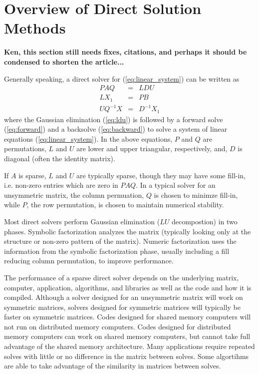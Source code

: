 \documentclass[acmtocl]{acmtrans2m}
\begin{document}
\section{Overview of Direct Solution Methods}
\label{sec:overview}

{\bf Ken, this section still needs fixes, citations, and perhaps it should
  be condensed to shorten the article... }

Generally speaking, a direct solver for (\ref{eq:linear_system}) can be
written as
\begin{eqnarray}
  \label{eq:ldu}
  PAQ & = & LDU \\
  \label{eq:forward}
  LX_1 & = & PB \\
  \label{eq:backward}
  UQ^{-1}X & = & D^{-1}X_1  
\end{eqnarray}
where the
Gaussian elimination (\ref{eq:ldu}) is followed by a forward solve
(\ref{eq:forward}) and a backsolve (\ref{eq:backward}) to solve a system of
linear equations (\ref{eq:linear_system}). In the above equations, $P$ and $Q$
are permutations,  $L$ and $U$ are lower and upper triangular, respectively,
and, $D$ is diagonal (often the identity matrix).  

If $A$ is sparse, $L$ and $U$ are typically sparse, though they may have some
fill-in, i.e. non-zero entries which are zero in $PAQ$.  
In a typical solver for an unsymmetric matrix, the column permuation,
$Q$ is chosen to minimze fill-in, while $P$, the row permutation, is
chosen to maintain numerical stability.  

Most direct solvers perform Gaussian elimination ($LU$ decompostion) in
two phases.  Symbolic factorization analyzes the matrix (typically
looking only at the structure or non-zero pattern of the matrix).
Numeric factorization uses the information from the symbolic
factorization phase, usually including a fill reducing column permutation, 
to improve performance.  

The performance of a sparse direct solver depends on the underlying
matrix, computer, application, algorithms, and libraries as well as
the code and how it is compiled.  Although a solver designed for an
unsymmetric matrix will work on symmetric matrices, solvers designed
for symmetric matrices will typically be faster on symmetric matrices.
Codes designed for shared memory computers will not run on distributed
memory computers.  Codes designed for distributed memory computers can
work on shared memory computers, but cannot take full advantage of the
shared memory architecture.  Many applications require repeated solves
with little or no difference in the matrix between solves.  Some
algortihms are able to take advantage of the similarity in matrices
between solves.
\end{document}
